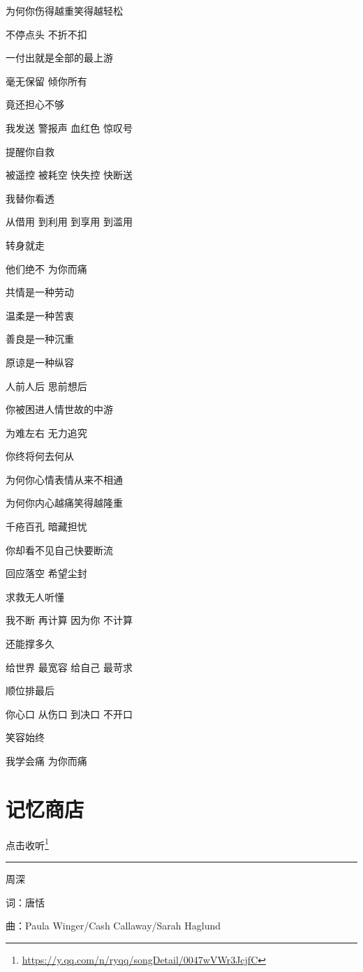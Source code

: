 \documentclass[]{ctexbook}
\renewcommand{\href}[2]{#2\footnote{\url{#1}}}
\begin{document}
为何你伤得越重笑得越轻松

不停点头 不折不扣

一付出就是全部的最上游

毫无保留 倾你所有

竟还担心不够

我发送 警报声 血红色 惊叹号

提醒你自救

被遥控 被耗空 快失控 快断送

我替你看透

从借用 到利用 到享用 到滥用

转身就走

他们绝不 为你而痛

共情是一种劳动

温柔是一种苦衷

善良是一种沉重

原谅是一种纵容

人前人后 思前想后

你被困进人情世故的中游

为难左右 无力追究

你终将何去何从

为何你心情表情从来不相通

为何你内心越痛笑得越隆重

千疮百孔 暗藏担忧

你却看不见自己快要断流

回应落空 希望尘封

求救无人听懂

我不断 再计算 因为你 不计算

还能撑多久

给世界 最宽容 给自己 最苛求

顺位排最后

你心口 从伤口 到决口 不开口

笑容始终

我学会痛 为你而痛

\section*{记忆商店}\label{the-memory-store}


\href{https://y.qq.com/n/ryqq/songDetail/0047wVWr3JcjfC}{点击收听}

\begin{center}\rule{0.5\linewidth}{0.5pt}\end{center}

周深

词：唐恬

曲：Paula Winger/Cash Callaway/Sarah Haglund
\end{document}
